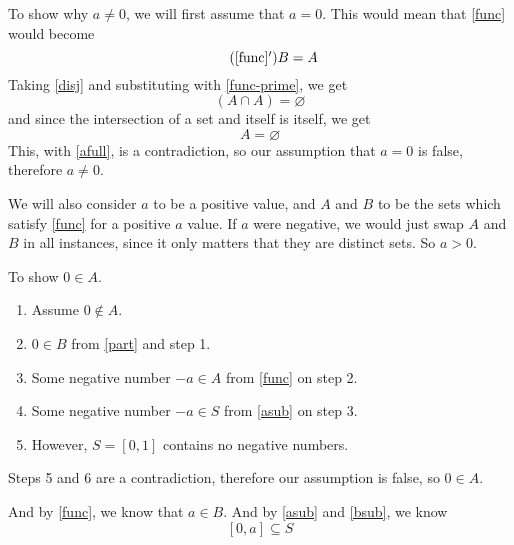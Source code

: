 \documentclass[12pt]{article}
\begin{document}
To show why $a \ne 0$, we will first assume that $a=0$. This would mean that \eqref{func} would become
\begin{equation} \tag{\ref{func}$^\prime$} \label{func-prime}
    B = A
\end{equation}
Taking \eqref{disj} and substituting with \eqref{func-prime}, we get
\[(A \cap A) = \varnothing\]
and since the intersection of a set and itself is itself, we get
\[A = \varnothing\]
This,  with \eqref{afull}, is a contradiction, so our assumption that $a=0$ is false, therefore $a \ne 0$. 

We will also consider $a$ to be a positive value, and $A$ and $B$ to be the sets which satisfy \eqref{func} for a positive $a$ value. If $a$ were negative, we would just swap $A$ and $B$ in all instances, since it only matters that they are distinct sets. So $a > 0$. 

\begin{framed}
    To show $0 \in A$.
    \begin{enumerate}
        \item Assume $0 \notin A$.
        \item $0 \in B$ from \eqref{part} and step 1.
        \item Some negative number $-a \in A$ from \eqref{func} on step 2.
        \item Some negative number $-a \in S$ from \eqref{asub} on step 3.
        \item However, $S = [0,1]$ contains no negative numbers.
    \end{enumerate}
    Steps 5 and 6 are a contradiction, therefore our assumption is false, so $0 \in A$. 
\end{framed}

And by \eqref{func}, we know that $a \in B$. And by \eqref{asub} and \eqref{bsub}, we know
\begin{equation} \label{0aS}
    [0,a] \subseteq S
\end{equation}
\end{document}
